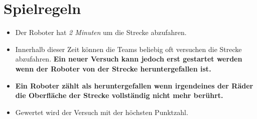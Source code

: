 \documentclass[a4paper,12pt]{article}
\begin{document}
\section{Spielregeln}
\begin{itemize}
\item Der Roboter hat \emph{2 Minuten} um die Strecke abzufahren.
\item Innerhalb dieser Zeit können die Teams beliebig oft versuchen die Strecke abzufahren.
\textbf{Ein neuer Versuch kann jedoch erst gestartet werden wenn der Roboter von der Strecke
heruntergefallen ist.}
\item \textbf{Ein Roboter zählt als heruntergefallen wenn irgendeines der Räder die Oberfläche der Strecke
vollständig nicht mehr berührt.}
\item Gewertet wird der Versuch mit der höchsten Punktzahl.
\end{itemize}
\end{document}
